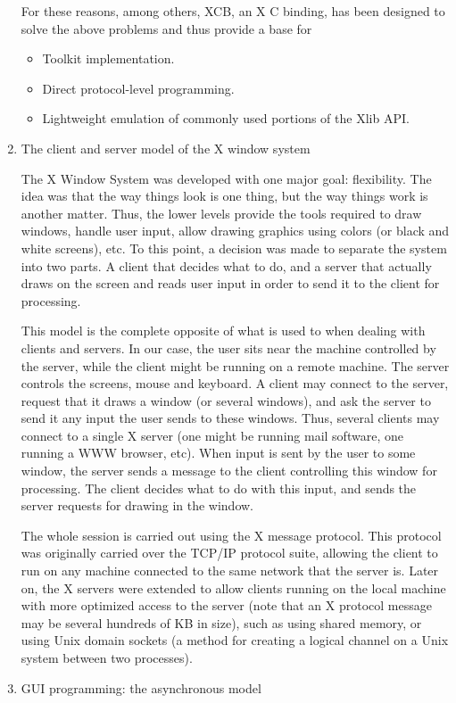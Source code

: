 \documentclass[12pt,oneside,titlepage]{book}
\providecommand{\tightlist}{%
  \setlength{\itemsep}{0pt}\setlength{\parskip}{0pt}}
\begin{document}
\begin{enumerate}
  For these reasons, among others, XCB, an X C binding, has been
  designed to solve the above problems and thus provide a base for

  \begin{itemize}
  \tightlist
  \item
    Toolkit implementation.
  \item
    Direct protocol-level programming.
  \item
    Lightweight emulation of commonly used portions of the Xlib API.
  \end{itemize}

  \hfill\break
\item
  \protect\hypertarget{Xmodel}{}{The client and server model of the X
  window system}

  The X Window System was developed with one major goal: flexibility.
  The idea was that the way things look is one thing, but the way things
  work is another matter. Thus, the lower levels provide the tools
  required to draw windows, handle user input, allow drawing graphics
  using colors (or black and white screens), etc. To this point, a
  decision was made to separate the system into two parts. A client that
  decides what to do, and a server that actually draws on the screen and
  reads user input in order to send it to the client for processing.

  This model is the complete opposite of what is used to when dealing
  with clients and servers. In our case, the user sits near the machine
  controlled by the server, while the client might be running on a
  remote machine. The server controls the screens, mouse and keyboard. A
  client may connect to the server, request that it draws a window (or
  several windows), and ask the server to send it any input the user
  sends to these windows. Thus, several clients may connect to a single
  X server (one might be running mail software, one running a WWW
  browser, etc). When input is sent by the user to some window, the
  server sends a message to the client controlling this window for
  processing. The client decides what to do with this input, and sends
  the server requests for drawing in the window.

  The whole session is carried out using the X message protocol. This
  protocol was originally carried over the TCP/IP protocol suite,
  allowing the client to run on any machine connected to the same
  network that the server is. Later on, the X servers were extended to
  allow clients running on the local machine with more optimized access
  to the server (note that an X protocol message may be several hundreds
  of KB in size), such as using shared memory, or using Unix domain
  sockets (a method for creating a logical channel on a Unix system
  between two processes).
\item
  \protect\hypertarget{asynch}{}{GUI programming: the asynchronous
  model}


\end{enumerate}
\end{document}
